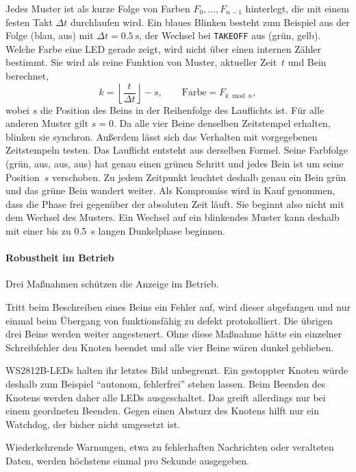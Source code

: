             Jedes Muster ist als kurze Folge von Farben $F_0, \dots, F_{n-1}$ hinterlegt, die mit einem festen Takt $\Delta t$ durchlaufen wird. Ein blaues Blinken besteht zum Beispiel aus der Folge (blau, aus) mit $\Delta t = \SI{0,5}{\second}$, der Wechsel bei \texttt{TAKEOFF} aus (grün, gelb). Welche Farbe eine LED gerade zeigt, wird nicht über einen internen Zähler bestimmt. Sie wird als reine Funktion von Muster, aktueller Zeit~$t$ und Bein berechnet, %
            \begin{equation}
                k = \left\lfloor \frac{t}{\Delta t} \right\rfloor - s, \qquad \text{Farbe} = F_{k \bmod n} ,
                \label{eq:LED_Farbe}
            \end{equation}
            wobei $s$ die Position des Beins in der Reihenfolge des Lauflichts ist. Für alle anderen Muster gilt $s = 0$. Da alle vier Beine denselben Zeitstempel erhalten, blinken sie synchron. Außerdem lässt sich das Verhalten mit vorgegebenen Zeitstempeln testen. Das Lauflicht entsteht aus derselben Formel. Seine Farbfolge (grün, aus, aus, aus) hat genau einen grünen Schritt und jedes Bein ist um seine Position~$s$ verschoben. Zu jedem Zeitpunkt leuchtet deshalb genau ein Bein grün und das grüne Bein wandert weiter. Als Kompromiss wird in Kauf genommen, dass die Phase frei gegenüber der absoluten Zeit läuft. Sie beginnt also nicht mit dem Wechsel des Musters. Ein Wechsel auf ein blinkendes Muster kann deshalb mit einer bis zu \SI{0,5}{\second} langen Dunkelphase beginnen.

            \paragraph{Robustheit im Betrieb}
            Drei Maßnahmen schützen die Anzeige im Betrieb.

            \begin{description}[style=nextline]
                \item[Fehlerisolation pro Bein] Tritt beim Beschreiben eines Beins ein Fehler auf, wird dieser abgefangen und nur einmal beim Übergang von funktionsfähig zu defekt protokolliert. Die übrigen drei Beine werden weiter angesteuert. Ohne diese Maßnahme hätte ein einzelner Schreibfehler den Knoten beendet und alle vier Beine wären dunkel geblieben.
                \item[Ausschalten beim Beenden] WS2812B-LEDs halten ihr letztes Bild unbegrenzt. Ein gestoppter Knoten würde deshalb zum Beispiel \enquote{autonom, fehlerfrei} stehen lassen. Beim Beenden des Knotens werden daher alle LEDs ausgeschaltet. Das greift allerdings nur bei einem geordneten Beenden. Gegen einen Absturz des Knotens hilft nur ein Watchdog, der bisher nicht umgesetzt ist.
                \item[Begrenzte Protokollierung] Wiederkehrende Warnungen, etwa zu fehlerhaften Nachrichten oder veralteten Daten, werden höchstens einmal pro Sekunde ausgegeben.
            \end{description}

